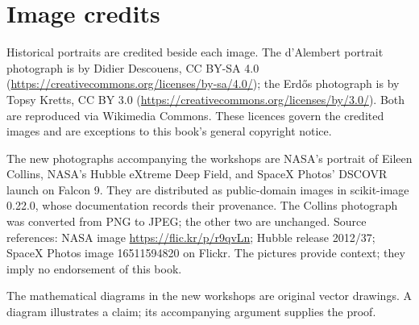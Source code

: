\chapter*{Image credits}
Historical portraits are credited beside each image. The d'Alembert portrait photograph is by Didier Descouens, CC BY-SA 4.0 (\url{https://creativecommons.org/licenses/by-sa/4.0/}); the Erd\H os photograph is by Topsy Kretts, CC BY 3.0 (\url{https://creativecommons.org/licenses/by/3.0/}). Both are reproduced via Wikimedia Commons. These licences govern the credited images and are exceptions to this book's general copyright notice.

The new photographs accompanying the workshops are NASA's portrait of Eileen Collins, NASA's Hubble eXtreme Deep Field, and SpaceX Photos' DSCOVR launch on Falcon 9. They are distributed as public-domain images in scikit-image 0.22.0, whose documentation records their provenance. The Collins photograph was converted from PNG to JPEG; the other two are unchanged. Source references: NASA image \url{https://flic.kr/p/r9qvLn}; Hubble release 2012/37; SpaceX Photos image 16511594820 on Flickr. The pictures provide context; they imply no endorsement of this book.

The mathematical diagrams in the new workshops are original vector drawings. A diagram illustrates a claim; its accompanying argument supplies the proof.
